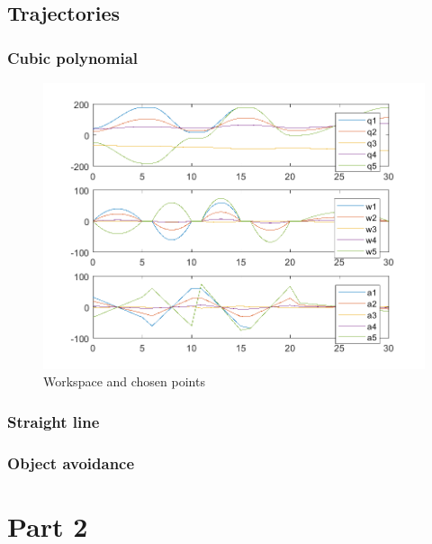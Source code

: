 \documentclass{article}
\begin{document}
\subsection{Trajectories}

\subsubsection{Cubic polynomial}

\begin{figure}
\begin{center}
\includegraphics[width=\textwidth]{images/JointTrayectories}
\caption{Workspace and chosen points}
\label{fig:points.ws_points}
\end{center}
\end{figure}

\subsubsection{Straight line}

\subsubsection{Object avoidance}





\section{Part 2}
\end{document}

